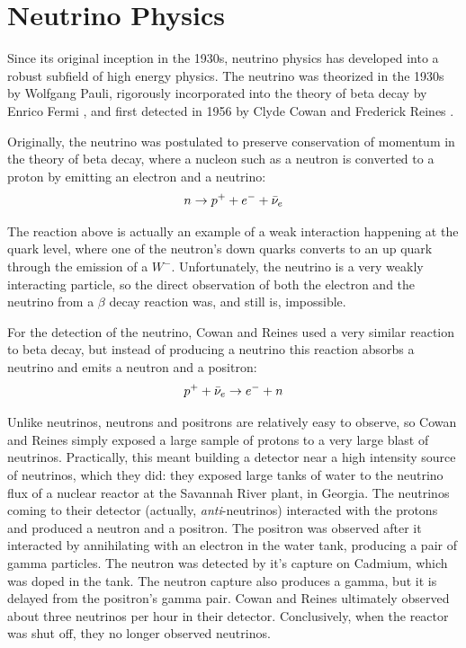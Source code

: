 \chapter{\label{chp:intro} Neutrino Physics}


Since its original inception in the 1930s, neutrino physics has developed into a robust subfield of high energy physics.  The neutrino was theorized in the 1930s by Wolfgang Pauli, rigorously incorporated into the theory of beta decay by Enrico Fermi \cite{Fermi}, and first detected in 1956 by Clyde Cowan and Frederick Reines \cite{Cowan:1992xc}.

Originally, the neutrino was postulated to preserve conservation of momentum in the theory of beta decay, where a nucleon such as a neutron is converted to a proton by emitting an electron and a neutrino:
\begin{equation}
\label{beta_decay}
n \rightarrow p^+ + e^- + \bar\nu_{e}
\end{equation}

The reaction above is actually an example of a weak interaction happening at the quark level, where one of the neutron's down quarks converts to an up quark through the emission of a $W^-$.  Unfortunately, the neutrino is a very weakly interacting particle, so the direct observation of both the electron and the neutrino from a $\beta$ decay reaction was, and still is, impossible.  

For the detection of the neutrino, Cowan and Reines used a very similar reaction to beta decay, but instead of producing a neutrino this reaction absorbs a neutrino and emits a neutron and a positron:
\begin{equation}
\label{inverse_beta_decay}
p^+  + \bar\nu_{e} \rightarrow e^- + n 
\end{equation}

Unlike neutrinos, neutrons and positrons are relatively easy to observe, so Cowan and Reines simply exposed a large sample of protons to a very large blast of neutrinos.  Practically, this meant building a detector near a high intensity source of neutrinos, which they did: they exposed large tanks of water to the neutrino flux of a nuclear reactor at the Savannah River plant, in Georgia.  The neutrinos coming to their detector (actually, {\em anti}-neutrinos) interacted with the protons and produced a neutron and a positron.  The positron was observed after it interacted by annihilating with an electron in the water tank, producing a pair of gamma particles.  The neutron was detected by it's capture on Cadmium, which was doped in the tank.  The neutron capture also produces a gamma, but it is delayed from the positron's gamma pair.  Cowan and Reines ultimately observed about three neutrinos per hour in their detector.  Conclusively, when the reactor was shut off, they no longer observed neutrinos. 


